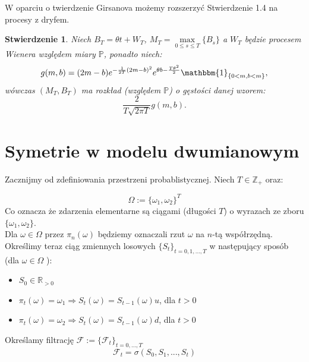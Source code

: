 \documentclass[11pt]{report}
\newtheorem{stw}{Stwierdzenie}[chapter]
\begin{document}
W oparciu o twierdzenie Girsanova możemy rozszerzyć Stwierdzenie 1.4 na procesy z dryfem.
\begin{stw}
Niech $ B_T = \theta t + W_T $, $M_T = \max\limits_{0 \le s \le T} \{ B_s \} $ a $W_T$ będzie procesem Wienera względem miary $\mathbb{P}$, ponadto niech:
$$ g(m,b) = (2m-b)e^{-\frac{1}{2T}(2m-b)^2}e^{\theta b-\frac{T\theta^2}{2}}\mathbbm{1}_{ \{ 0<m, b<m \}}, $$
wówczas $(M_T,B_T)$ ma rozkład (względem $\mathbb{P}$) o gęstości danej wzorem:
\begin{equation*}
\frac{2}{T\sqrt{2\pi T}}g(m,b).
\end{equation*}

\end{stw}






\chapter{Symetrie w modelu dwumianowym}
Zacznijmy od zdefiniowania przestrzeni probablistycznej. Niech $T \in \mathbb{Z}_{+}$ oraz:


$$\Omega := \{\omega_1 , \omega_2 \}^{T} $$ 
Co oznacza że zdarzenia elementarne są ciągami (długości $T$) o wyrazach ze zboru $\{\omega_1, \omega_2 \} $. \\
Dla $\omega \in \Omega$ przez $\pi_n(\omega) $ będziemy oznaczali rzut $\omega$ na $n$-tą współrzędną. \\
Określimy teraz ciąg zmiennych losowych $\{ S_t \}_{t=0,1,...,T}$ w następujący sposób (dla $\omega \in \Omega $ ): 
\begin{itemize}
\item $ S_0 \in \mathbb{R}_{>0} $
\item $\pi_t(\omega) = \omega_1 \Rightarrow S_t(\omega) = S_{t-1}(\omega)u$, dla $t>0$ 
\item $\pi_t(\omega) = \omega_2 \Rightarrow S_t(\omega) = S_{t-1}(\omega)d$, dla $t>0$ 
\end{itemize}

Określamy filtrację $\mathscr{F}:= \{ \mathscr{F}_t \}_{t=0,...,T}$
              $$\mathscr{F}_t = \sigma (S_0,S_1,...,S_t) $$
              
\end{document}
